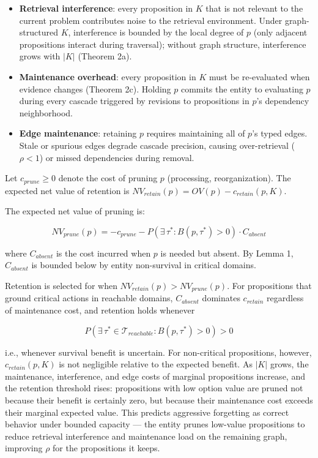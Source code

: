 \documentclass[
]{article}
\providecommand{\tightlist}{%
  \setlength{\itemsep}{0pt}\setlength{\parskip}{0pt}}
\begin{document}
\begin{itemize}
\tightlist
\item
  \textbf{Retrieval interference}: every proposition in \(K\) that is
  not relevant to the current problem contributes noise to the retrieval
  environment. Under graph-structured \(K\), interference is bounded by
  the local degree of \(p\) (only adjacent propositions interact during
  traversal); without graph structure, interference grows with \(|K|\)
  (Theorem 2a).
\item
  \textbf{Maintenance overhead}: every proposition in \(K\) must be
  re-evaluated when evidence changes (Theorem 2c). Holding \(p\) commits
  the entity to evaluating \(p\) during every cascade triggered by
  revisions to propositions in \(p\)'s dependency neighborhood.
\item
  \textbf{Edge maintenance}: retaining \(p\) requires maintaining all of
  \(p\)'s typed edges. Stale or spurious edges degrade cascade precision,
  causing over-retrieval (\(\rho < 1\)) or missed dependencies during
  removal.
\end{itemize}

Let \(c_{prune} \geq 0\) denote the cost of pruning \(p\) (processing,
reorganization). The expected net value of retention is
\(NV_{retain}(p) = OV(p) - c_{retain}(p, K)\).

The expected net value of pruning is:

\[NV_{prune}(p) = -c_{prune} - P\!\left(\exists\,\tau^* : B(p,\tau^*) > 0\right) \cdot C_{absent}\]

where \(C_{absent}\) is the cost incurred when \(p\) is needed but
absent. By Lemma 1, \(C_{absent}\) is bounded below by entity
non-survival in critical domains.

Retention is selected for when \(NV_{retain}(p) > NV_{prune}(p)\). For
propositions that ground critical actions in reachable domains,
\(C_{absent}\) dominates \(c_{retain}\) regardless of maintenance cost,
and retention holds whenever

\[P\!\left(\exists\,\tau^* \in \mathcal{T}_{reachable} : B(p,\tau^*) > 0\right) > 0\]

i.e., whenever survival benefit is uncertain. For non-critical
propositions, however, \(c_{retain}(p, K)\) is not negligible relative
to the expected benefit. As \(|K|\) grows, the maintenance, interference,
and edge costs of marginal propositions increase, and the retention
threshold rises: propositions with low option value are pruned not
because their benefit is certainly zero, but because their maintenance
cost exceeds their marginal expected value. This predicts aggressive
forgetting as correct behavior under bounded capacity --- the entity
prunes low-value propositions to reduce retrieval interference and
maintenance load on the remaining graph, improving \(\rho\) for the
propositions it keeps.
\end{document}
